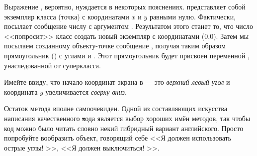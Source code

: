 \documentclass[a4paper,10pt,twoside]{book}
\begin{document}
Выражение , вероятно, нуждается в некоторых пояснениях.
 представляет собой экземпляр класса  (точка) с координатами $x$ и $y$ равными нулю.
Фактически,  посылает сообщение 
числу  с аргументом .
Результатом этого станет то, что число  <<попросит>> класс  создать новый экземпляр с координатами (0,0).
Затем мы посылаем созданному объекту-точке сообщение , получая таким образом прямоугольник () с углами  и .
Этот прямоугольник будет присвоен переменной , унаследованной от суперкласса.

Имейте ввиду, что начало координат экрана в \pharo --- это \emph{верхний левый угол} и координата $y$ увеличивается \emph{сверху вниз}.

Остаток метода вполне самоочевиден.
Одной из составляющих искусства написания качественного \st кода является выбор хороших имён методов, так чтобы код можно было читать словно некий гибридный вариант английского.
Просто попробуйте вообразить объект, говорящий себе <<Я должен использовать острые углы! >>, <<Я должен выключиться! >>.
\end{document}

